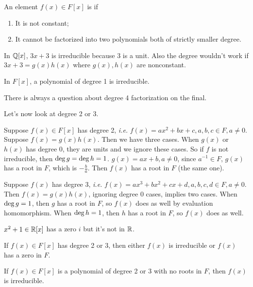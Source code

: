 \documentclass[class=article,crop=false]{standalone}
\begin{document}
\begin{defn}
	An element $ f(x) \in F[x]$ is  if
	\begin{enumerate}[label=(\roman*)]
		\item It is not constant;
		\item It cannot be factorized into two polynomials both of strictly smaller degree.
	\end{enumerate}
\end{defn}

\begin{eg}[]
	In $ \mathbb{Q}[x]$, $ 3x+3$ is irreducible because  $ 3$ is a unit. Also the degree wouldn't work if  $ 3x+3 = g(x)h(x)$ where $ g(x),h(x)$ are nonconstant.
\end{eg}


\begin{coro}[]
	In $ F[x]$, a polynomial of degree 1 is irreducible. 
\end{coro}

\begin{remark}
	There is always a question about degree 4 factorization on the final.
\end{remark}

Let's now look at degree 2 or 3.

Suppose $ f(x) \in F[x]$ has degree 2, \emph{i.e.} $ f(x) = ax^2 +b x + c, a,b,c \in F, a \neq 0$. Suppose $ f(x)=g(x)h(x)$. Then we have three cases. When $ g(x)$ or  $ h(x)$ has degree 0, they are units and we ignore these cases. So if  $ f$ is not irreducible, then  $ \operatorname{deg} g = \operatorname{deg} h =1$. $ g(x) = ax+b, a \neq 0$, since  $ a^{-1} \in F$, $ g(x)$ has a root in  $ F$, which is  $ -\frac{b}{a}$. Then $ f(x)$ has a root in  $ F$ (the same one).

Suppose  $ f(x)$ has degree 3,  \emph{i.e.} $ f(x) = ax^3+bx^2+cx+d, a,b,c,d \in F, a\neq 0$. Then $ f(x) = g(x)h(x)$, ignoring degree 0 cases, implies two cases.  When $ \operatorname{deg} g=1$, then $ g$ has a root in  $ F$, so  $ f(x)$ does as well by evaluation homomorphism. When  $ \operatorname{deg} h=1$, then $ h$ has a root in  $ F$, so  $ f(x)$ does as well.

\begin{eg}[]
	$ x^2+1 \in \mathbb{R}[x]$ has a zero $ i$ but it's not in  $ \mathbb{R}$.
\end{eg}

\begin{thm}[23.10]
	If $ f(x) \in F[x]$ has degree 2 or 3, then either  $ f(x) $ is irreducible or  $ f(x)$ has a zero in  $ F$. 
\end{thm}
\begin{coro}[]
	If $ f(x) \in F[x]$ is a polynomial of degree 2 or 3 with no roots in $ F$, then  $ f(x)$ is irreducible.
\end{coro}
\end{document}
